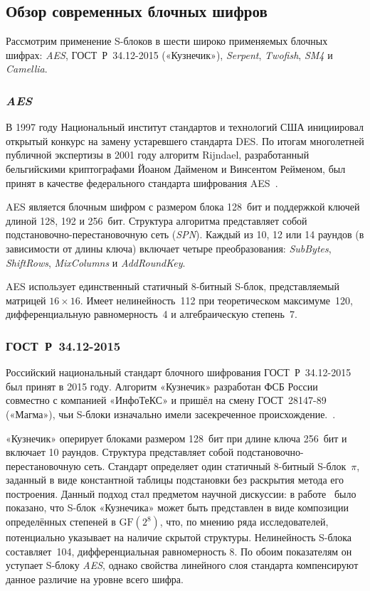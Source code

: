 \subsection{Обзор современных блочных шифров}
\indent Рассмотрим применение S-блоков в шести широко
применяемых блочных шифрах: \textit{AES}, ГОСТ~Р~34.12-2015 («Кузнечик»), \textit{Serpent},
\textit{Twofish}, \textit{SM4} и \textit{Camellia}.

\subsubsection{\textit{AES}}

В 1997 году Национальный институт стандартов и технологий США
инициировал открытый конкурс на замену устаревшего стандарта DES.
По итогам многолетней публичной экспертизы в 2001 году алгоритм Rijndael,
разработанный бельгийскими криптографами Йоаном Дайменом
и Винсентом Рейменом, был принят в качестве федерального
стандарта шифрования AES~\cite{fips197}.

AES является блочным шифром с размером блока 128~бит и поддержкой ключей
длиной 128, 192 и 256~бит. Структура алгоритма представляет собой
подстановочно-перестановочную сеть (\textit{SPN}). Каждый из 10, 12 или 14 раундов
(в зависимости от длины ключа) включает четыре преобразования:
\textit{SubBytes}, \textit{ShiftRows}, \textit{MixColumns} и \textit{AddRoundKey}.

AES использует единственный статичный 8-битный S-блок, представляемый
матрицей $16 \times 16$. Имеет нелинейность~112 при теоретическом максимуме~120, дифференциальную
равномерность~4 и алгебраическую степень~7.

\subsubsection{ГОСТ~Р~34.12-2015}

Российский национальный стандарт блочного шифрования ГОСТ~Р~34.12-2015
был принят в 2015 году. Алгоритм «Кузнечик» разработан ФСБ России совместно
с компанией «ИнфоТеКС» и пришёл на смену ГОСТ~28147-89 («Магма»), чьи
S-блоки изначально имели засекреченное происхождение.~\cite{gost2015}.

«Кузнечик» оперирует блоками размером 128~бит при длине ключа 256~бит
и включает 10 раундов. Структура представляет собой подстановочно-перестановочную сеть.
Стандарт определяет один статичный 8-битный S-блок~$\pi$, заданный в виде
константной таблицы подстановки без раскрытия метода его построения.
Данный подход стал предметом научной дискуссии: в работе~\cite{biryukov2016}
было показано, что S-блок «Кузнечика» может быть представлен в виде
композиции определённых степеней в $\mathrm{GF}(2^8)$, что, по мнению ряда
исследователей, потенциально указывает на наличие скрытой структуры.
Нелинейность S-блока составляет~104, дифференциальная равномерность 8.
По обоим показателям он уступает S-блоку \textit{AES}, однако свойства линейного слоя
стандарта компенсируют данное различие на уровне всего шифра.

